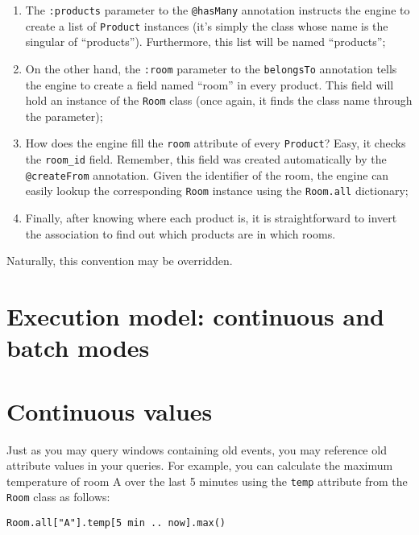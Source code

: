 \documentclass{report}
\begin{document}
\begin{enumerate}
\item The \verb=:products= parameter to the \verb=@hasMany= annotation
  instructs the engine to create a list of \verb=Product= instances
  (it's simply the class whose name is the singular of
  ``products''). Furthermore, this list will be named ``products'';
\item On the other hand, the \verb=:room= parameter to the
  \verb=belongsTo= annotation tells the engine to create a field named
  ``room'' in every product. This field will hold an instance of the
  \verb=Room= class (once again, it finds the class name through the
  parameter);
\item How does the engine fill the \verb=room= attribute of every
  \verb=Product=? Easy, it checks the \verb=room_id= field. Remember,
  this field was created automatically by the \verb=@createFrom=
  annotation. Given the identifier of the room, the engine can easily
  lookup the corresponding \verb=Room= instance using the
  \verb=Room.all= dictionary;
\item Finally, after knowing where each product is, it is
  straightforward to invert the association to find out which products
  are in which rooms.
\end{enumerate}

Naturally, this convention may be overridden.


\chapter{Execution model: continuous and batch modes}



\chapter{Continuous values}
\label{chap:continuous-values}

Just as you may query windows containing old events, you may reference
old attribute values in your queries. For example, you can calculate
the maximum temperature of room A over the last 5 minutes using the
\verb=temp= attribute from the \verb=Room= class as follows:

\begin{verbatim}
Room.all["A"].temp[5 min .. now].max()
\end{verbatim}
\end{document}
